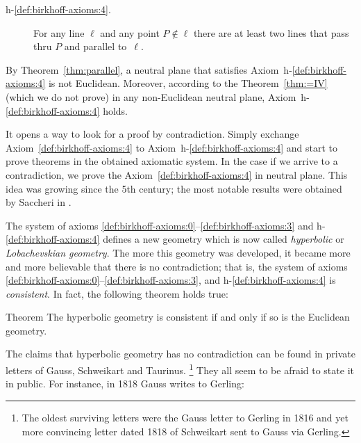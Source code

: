 \begin{framed}
\begin{description}
\item[{\rm h-$\!$\ref{def:birkhoff-axioms:4}.}]\label{def:hyperbolic-4a}  
For any line $\ell$ and any point $P\notin\ell$ 
there are at least two lines that pass thru $P$ and parallel to~$\ell$.
\end{description}
\end{framed}

By Theorem~\ref{thm:parallel}, a neutral plane that satisfies Axiom~h-$\!$\ref{def:birkhoff-axioms:4} is not Euclidean. 
Moreover, according to the Theorem~\ref{thm:=IV} (which we do not prove) 
in any non-Euclidean neutral plane, Axiom~h-$\!$\ref{def:birkhoff-axioms:4} holds.

It opens a way to look for a proof by contradiction.
Simply exchange  Axiom~\ref{def:birkhoff-axioms:4} to Axiom~h-$\!$\ref{def:birkhoff-axioms:4}
 and start to prove theorems in the obtained axiomatic system.
In the case if we arrive to a contradiction, 
we prove the Axiom~\ref{def:birkhoff-axioms:4} in neutral plane.
This idea was growing since the 5th century;
the most notable results were obtained by Saccheri in \cite{saccheri}.

The system of axioms \ref{def:birkhoff-axioms:0}--\ref{def:birkhoff-axioms:3} and h-$\!$\ref{def:birkhoff-axioms:4} defines a new geometry which is now called \emph{hyperbolic} or \emph{Lobachevskian geometry}.
The more this geometry was developed,
it became more and more believable that there is no contradiction;
that is, the system of axioms \ref{def:birkhoff-axioms:0}--\ref{def:birkhoff-axioms:3}, and h-$\!$\ref{def:birkhoff-axioms:4} is \emph{consistent}.
In fact, the following theorem holds true:


\begin{thm}{Theorem}\label{thm:consistent}
The hyperbolic geometry is consistent if and only if so is the Euclidean geometry.
\end{thm}

The claims
that hyperbolic geometry has no contradiction can be found in private letters of
Gauss, 
Schweikart 
and Taurinus.%
\footnote{The oldest surviving letters were the Gauss letter to Gerling in 1816 
and yet more convincing letter dated 1818 
of Schweikart sent to Gauss via Gerling.}
They all seem to be afraid to state it in public.
For instance, in 1818 Gauss writes to Gerling:

